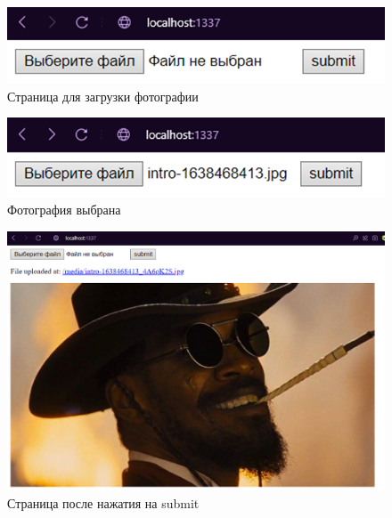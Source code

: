 \begin{figure}[!ht]
  \centering
  \includegraphics[scale=0.8]{ResearchNotes/rndhpc_not_gui_2022_11_04/picture2.png}
  \caption{Страница для загрузки фотографии}
  \label{picture2}
\end{figure}

\begin{figure}[!ht]
  \centering
  \includegraphics[scale=0.8]{ResearchNotes/rndhpc_not_gui_2022_11_04/picture3.png}
  \caption{Фотография выбрана}
  \label{picture3}
\end{figure}

\begin{figure}[!ht]
  \centering
  \includegraphics[scale=0.8]{ResearchNotes/rndhpc_not_gui_2022_11_04/picture4.png}
  \caption{Страница после нажатия на submit}
  \label{picture4}
\end{figure}
\noteattributes{}
